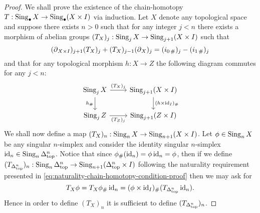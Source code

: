\begin{proof}
    We shall prove the existence of the chain-homotopy
    \(T: \operatorname{Sing}_{\bullet} X \to \operatorname{Sing}_{\bullet}(X \times I)\) via induction. Let
    \(X\) denote any topological space and suppose there exists \(n > 0\) such that
    for any integer \(j < n\) there exists a morphism of abelian groups \((T_X)_j:
    \operatorname{Sing}_j X \to \operatorname{Sing}_{j+1}(X \times I)\) such that
    \begin{equation}\label{eq:chain-homotopy-condition-proof}
        (\operatorname{\partial}_{X \times I})_{j+1} (T_X)_j + (T_X)_{j-1} (\operatorname{\partial}_X)_j
        = (i_{0\, \#})_j - (i_{1\, \#})_j
    \end{equation}
    and that for any topological morphism \(h: X \to Z\) the following diagram
    commutes for any \(j < n\):
    \begin{equation}\label{eq:naturality-chain-homotopy-condition-proof}
        \begin{tikzcd}
            \Sing_j X \ar[r, "(T_X)_j"] \ar[d, "h_{\#}"']
            &\Sing_{j+1}(X \times I) \ar[d, "(h \times \Id_I)_{\#}"] \\
            \Sing_j Z \ar[r, "(T_Z)_j"']
            &\Sing_{j+1}(Z \times I)
        \end{tikzcd}
    \end{equation}
    We shall now define a map \((T_X)_n: \operatorname{Sing}_n X \to \operatorname{Sing}_{n+1}(X \times
    I)\). Let \(\phi \in \operatorname{Sing}_n X\) be any singular \(n\)-simplex and consider the
    identity singular \(n\)-simplex \(\operatorname{id}_n \in \operatorname{Sing}_n \Delta_{\text{top}}^n\). Notice that
    since \(\phi_{\#}(\operatorname{id}_n) = \phi \operatorname{id}_n = \phi\), then if we define
    \((T_{\Delta_{\text{top}}^n})_n: \operatorname{Sing}_n\Delta_{\text{top}}^n \to \operatorname{Sing}_{n+1}(\Delta_{\text{top}}^n \times I)\)
    following the naturality requirement presented in
    \cref{eq:naturality-chain-homotopy-condition-proof} then we may ask for
    \begin{equation}\label{eq:T-X-n-phi-chain-homotopy}
        T_X\phi = T_X \phi_{\#}\operatorname{id}_n
        = (\phi \times \operatorname{id}_I)_{\#}(T_{\Delta_{\text{top}}^n} \operatorname{id}_n).
    \end{equation}
    Hence in order to define \((T_X)_n\) it is sufficient to define
    \((T_{\Delta_{\text{top}}^n})_n\).


\end{proof}
